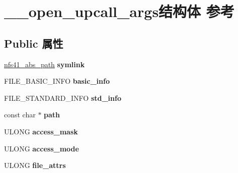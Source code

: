 \hypertarget{struct____open__upcall__args}{}\section{\+\_\+\+\_\+open\+\_\+upcall\+\_\+args结构体 参考}
\label{struct____open__upcall__args}
\subsection*{Public 属性}
\begin{DoxyCompactItemize}
\item 
\mbox{\label{struct____open__upcall__args_ab01f112621933893ee714c1d0df12e99}} 
\hyperlink{struct____nfs41__abs__path}{nfs41\+\_\+abs\+\_\+path} {\bfseries symlink}
\item 
\mbox{\label{struct____open__upcall__args_ad2dbd55ed3109e8c9491c6d06b04ca4a}} 
F\+I\+L\+E\+\_\+\+B\+A\+S\+I\+C\+\_\+\+I\+N\+FO {\bfseries basic\+\_\+info}
\item 
\mbox{\label{struct____open__upcall__args_ae20d6cdc38cd22c4de3f21646d3393a4}} 
F\+I\+L\+E\+\_\+\+S\+T\+A\+N\+D\+A\+R\+D\+\_\+\+I\+N\+FO {\bfseries std\+\_\+info}
\item 
\mbox{\label{struct____open__upcall__args_a79ec638488d7a55479e923488d75520b}} 
const char $\ast$ {\bfseries path}
\item 
\mbox{\label{struct____open__upcall__args_aa8df965a76351ddca4b603c87f17576a}} 
U\+L\+O\+NG {\bfseries access\+\_\+mask}
\item 
\mbox{\label{struct____open__upcall__args_acb4ed56a9c51d09161dd93cfd794f234}} 
U\+L\+O\+NG {\bfseries access\+\_\+mode}
\item 
\mbox{\label{struct____open__upcall__args_a3626504bb3a8b5580a90663fe6a1f673}} 
U\+L\+O\+NG {\bfseries file\+\_\+attrs}
\item 
\mbox{\label{struct____open__upcall__args_acf7e153041f21feebd77578526c49919}} 

\end{DoxyCompactItemize}
